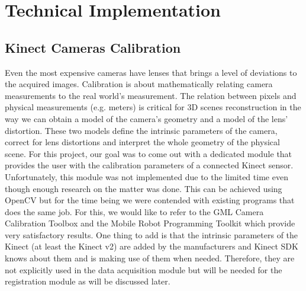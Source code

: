 \documentclass[a4paper]{report}
\begin{document}
\chapter{Technical Implementation}
\section{Kinect Cameras Calibration}
Even the most expensive cameras have lenses that brings a level of deviations to the acquired images. Calibration is about mathematically relating camera measurements to the real world’s measurement. The relation between pixels and physical measurements (e.g. meters) is critical for 3D scenes reconstruction in the way we can obtain a model of the camera's geometry and a model of the lens' distortion. These two models define the intrinsic parameters of the camera, correct for lens distortions and interpret the whole geometry of the physical scene.
For this project, our goal was to come out with a dedicated module that provides the user with the calibration parameters of a connected Kinect sensor. Unfortunately, this module was not implemented due to the limited time even though enough research on the matter was done. This can be achieved using OpenCV but for the time being we were contended with existing programs that does the same job. For this, we would like to refer to the GML Camera Calibration Toolbox  and the Mobile Robot Programming Toolkit which provide very satisfactory results.
One thing to add is that the intrinsic parameters of the Kinect (at least the Kinect v2) are added by the manufacturers and Kinect SDK knows about them and is making use of them when needed. Therefore, they are not explicitly used in the data acquisition module but will be needed for the registration module as will be discussed later.
\end{document}
